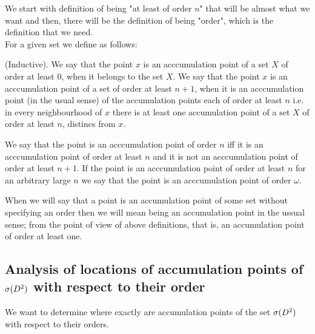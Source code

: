 We start with definition of being "at least of order $n$" that will be almost what we want
and then, there will be the definition of being "order", which is the definition that we need. \\
For a given set we define as follows:
\begin{definition}
(Inductive). 
We say that the point $x$ is an acccumulation point of a set $X$ 
of order at least $0$, when it belongs to the set $X$. 
We say that the point $x$ is an acccumulation point of a set 
of order at least $n + 1$, when it is 
an acccumulation point (in the usual sense) of the accumulation points each of order at least 
$n$ i.e. in every neighbourhood of $x$ there is at least one accumulation point of a set $X$ 
of order at least $n$, distincs from $x$. 
\end{definition}  
\begin{definition}
We say that the point is an acccumulation point of order $n$ iff it is an acccumulation point 
of order at least $n$ and it is not an acccumulation point of order at least $n+1$. 
If the point is an acccumulation point of order at least $n$ for an arbitrary large 
$n$ we say that 
the point is an acccumulation point of order $\omega$.
\end{definition}
When we will say that a point is an accumulation point of some set without specifying an order 
then we will mean being an accumulation point in the ussual sense; from the point of view 
of above definitions, that is, an accumulation point of order at least one.

\subsection{Analysis of locations of accumulation points of ${{\sigma}(D^2)}$ with respect to their order}
We want to determine where exactly are accumulation points of the set ${{\sigma}(D^2)}$ with 
respect to their orders. 

